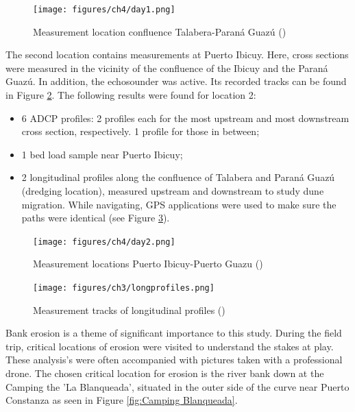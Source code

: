 \begin{figure}[H]
    \centering
    \texttt{[image: figures/ch4/day1.png]}
    \caption{Measurement location confluence Talabera-Paraná Guazú (\cite{googleearth2025})}
    \label{fig:measurements day1}
\end{figure}

The second location contains measurements at Puerto Ibicuy. Here, cross sections were measured in the vicinity of the confluence of the Ibicuy and the Paraná Guazú. In addition, the echosounder was active. Its recorded tracks can be found in Figure \ref{fig:measurements day2}. The following results were found for location 2:
\begin{itemize}
    \item 6 ADCP profiles: 2 profiles each for the most upstream and most downstream cross section, respectively. 1 profile for those in between; 
    \item 1 bed load sample near Puerto Ibicuy;
    \item 2 longitudinal profiles along the confluence of Talabera and Paraná Guazú (dredging location), measured upstream and downstream to study dune migration. While navigating, GPS applications were used to make sure the paths were identical (see Figure \ref{fig:longprofiles map}).
\end{itemize}

\begin{figure}[H]
    \centering
    \texttt{[image: figures/ch4/day2.png]}
    \caption{Measurement locations Puerto Ibicuy-Puerto Guazu (\cite{googleearth2025})}
    \label{fig:measurements day2}
\end{figure}

\begin{figure}[H]
    \centering
    \texttt{[image: figures/ch3/longprofiles.png]}
    \caption{Measurement tracks of longitudinal profiles (\cite{googleearth2025})}
    \label{fig:longprofiles map}
\end{figure}

Bank erosion is a theme of significant importance to this study. During the field trip, critical locations of erosion were visited to understand the stakes at play. These analysis's were often accompanied with pictures taken with a professional drone. The chosen critical location for erosion is the river bank down at the Camping the 'La Blanqueada', situated in the outer side of the curve near Puerto Constanza as seen in Figure \ref{fig:Camping Blanqueada}.

